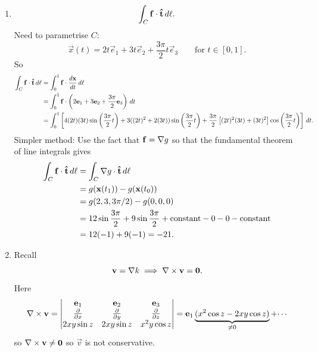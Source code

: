 \documentclass[10pt, a4paper]{article}
\begin{document}
\begin{problem}[$2019$ Question $3$]
\begin{solution}
\begin{enumerate}[label = (\alph*)]
            \item
            \[
            \int_{C}\mathbf{f}\cdot\mathbf{\hat{t}}\,d\ell.
            \]
            Need to parametrise $C$:
            \[
            \vec{x}(t) = 2t\vec{e}_1 + 3t\vec{e}_2 + \frac{3\pi}{2}t\vec{e}_3\qquad\text{for } t \in [0, 1].
            \]
            So
            \begin{align*}
                \int_{C}\mathbf{f}\cdot\mathbf{\hat{t}}\,d\ell &= \int_{0}^{1}\mathbf{f}\cdot\frac{d\mathbf{x}}{dt}\,d\ell \\
                &= \int_{0}^{1}\mathbf{f}\cdot\left(2\mathbf{e}_1 + 3\mathbf{e}_2 + \frac{3\pi}{2}\mathbf{e}_3\right)\,dt \\
                &= \int_{0}^{1}\left[4(2t)(3t)\sin\left(\frac{3\pi}{2}t\right) + 3((2t) ^ 2 + 2(3t))\sin\left(\frac{3\pi}{2}t\right) + \frac{3\pi}{2}\left[(2t) ^ 2(3t) + (3t) ^ 2\right]\cos\left(\frac{3\pi}{2}t\right)\right]\,dt.
            \end{align*}
            Simpler method:
            Use the fact that $\mathbf{f} = \mathbf{\nabla} g$ so that the fundamental theorem of line integrals gives
            \begin{align*}
                \int_{C}\mathbf{f}\cdot\mathbf{\hat{t}}\,d\ell &= \int_{C}\mathbf{\nabla} g\cdot\mathbf{\hat{t}}\,d\ell \\
                &= g(\mathbf{x}(t_1)) - g(\mathbf{x}(t_0)) \\
                &= g(2, 3, 3\pi / 2) - g(0, 0, 0) \\
                &= 12\sin{\frac{3\pi}{2}} + 9\sin{\frac{3\pi}{2}} + \text{constant} - 0 - 0 - \text{constant} \\
                &= 12(-1) + 9(-1) = -21.
            \end{align*}

            \item
            Recall
            \[
            \mathbf{v} = \mathbf{\nabla} k \implies \mathbf{\nabla} \times \mathbf{v} = \mathbf{0}.
            \]
            Here
            \[
            \mathbf{\nabla} \times \mathbf{v} = \begin{vmatrix}
                \mathbf{e}_1 & \mathbf{e}_2 & \mathbf{e}_3 \\
                \frac{\partial }{\partial x} & \frac{\partial }{\partial y} & \frac{\partial }{\partial z} \\
                2xy\sin{z} & 2xy\sin{z} & x ^ 2y\cos{z}
            \end{vmatrix} = \mathbf{e}_1\underbrace{(x ^ 2\cos{z} - 2xy\cos{z})}_{\neq 0} + \dotsi
            \]
            so $\mathbf{\nabla} \times \mathbf{v} \neq \mathbf{0}$ so $\vec{v}$ is not conservative.
        \end{enumerate}
    \end{solution}
\end{problem}
\end{document}
